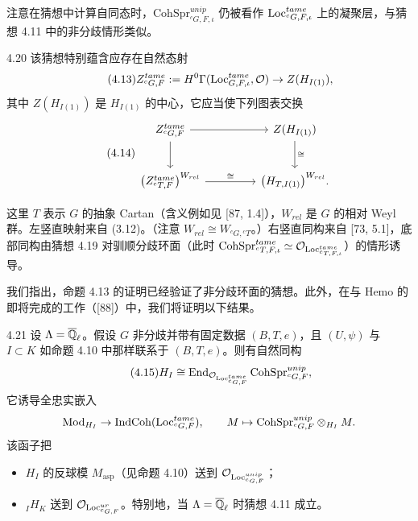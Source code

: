 注意在猜想中计算自同态时，$\mathrm{CohSpr}^{unip}_{{}^cG,F,\iota}$ 仍被看作 $\operatorname{Loc}^{tame}_{{}^cG,F,\iota}$ 上的凝聚层，与猜想 4.11 中的非分歧情形类似。

\begin{rem}{4.20}
该猜想特别蕴含应存在自然态射
\begin{equation}
\tag{4.13}
Z^{tame}_{{}^cG,F}:=H^0\Gamma(\operatorname{Loc}^{tame}_{G,F,\iota},\mathcal{O})\to Z(H_{I(1)}),
\end{equation}
其中 $Z(H_{I(1)})$ 是 $H_{I(1)}$ 的中心，它应当使下列图表交换
\begin{equation}
\tag{4.14}
\begin{tikzcd}[row sep=2.4em,column sep=4.5em]
Z^{tame}_{{}^cG,F}\arrow[r]\arrow[d] & Z(H_{I(1)})\arrow[d,"\cong"]\\
\big(Z^{tame}_{{}^cT,F}\big)^{W_{rel}}\arrow[r,"\cong"] & \big(H_{T,I(1)}\big)^{W_{rel}}.
\end{tikzcd}
\end{equation}
\end{rem}

这里 $T$ 表示 $G$ 的抽象 Cartan（含义例如见 [87, 1.4]），$W_{rel}$ 是 $G$ 的相对 Weyl 群。左竖直映射来自 (3.12)。（注意 $W_{rel}\cong W_{{}^cG,{}^cT}$。）右竖直同构来自 [73, 5.1]，底部同构由猜想 4.19 对驯顺分歧环面（此时 $\mathrm{CohSpr}^{tame}_{{}^cT,F,\iota}\simeq\mathcal{O}_{\operatorname{Loc}^{tame}_{{}^cT,F,\iota}}$）的情形诱导。

我们指出，命题 4.13 的证明已经验证了非分歧环面的猜想。此外，在与 Hemo 的即将完成的工作（[88]）中，我们将证明以下结果。

\begin{thm}{4.21}
设 $\Lambda=\overline{\mathbb{Q}}_\ell$。假设 $G$ 非分歧并带有固定数据 $(B,T,e)$，且 $(U,\psi)$ 与 $I\subset K$ 如命题 4.10 中那样联系于 $(B,T,e)$。则有自然同构
\begin{equation}
\tag{4.15}
H_I\cong\operatorname{End}_{\mathcal{O}_{\operatorname{Loc}^{tame}_{{}^cG,F}}}\mathrm{CohSpr}^{unip}_{{}^cG,F},
\end{equation}
它诱导全忠实嵌入
\[
\operatorname{Mod}_{H_I}\to\operatorname{IndCoh}(\operatorname{Loc}^{tame}_{{}^cG,F}),\qquad
M\mapsto\mathrm{CohSpr}^{unip}_{{}^cG,F}\otimes_{H_I}M.
\]
该函子把
\begin{itemize}[leftmargin=1.6em,itemsep=0.2em]
\item $H_I$ 的反球模 $M_{\mathrm{asp}}$（见命题 4.10）送到 $\mathcal{O}_{\operatorname{Loc}^{unip}_{{}^cG,F}}$；
\item ${}_IH_K$ 送到 $\mathcal{O}_{\operatorname{Loc}^{ur}_{{}^cG,F}}$。特别地，当 $\Lambda=\overline{\mathbb{Q}}_\ell$ 时猜想 4.11 成立。
\end{itemize}
\end{thm}


